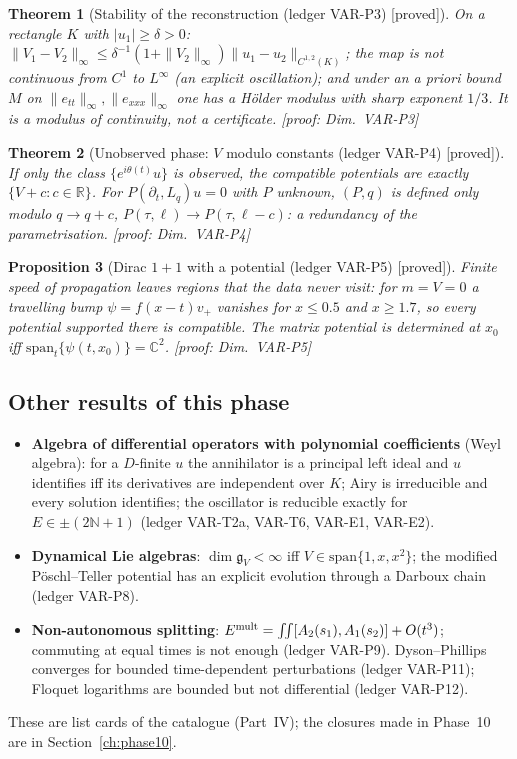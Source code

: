\documentclass[11pt]{article}
\theoremstyle{plain}
\newtheorem{theorem}{Theorem}[section]
\newtheorem{proposition}[theorem]{Proposition}
\theoremstyle{definition}
\theoremstyle{remark}
\newcommand{\R}{\mathbb{R}}
\newcommand{\C}{\mathbb{C}}
\newcommand{\N}{\mathbb{N}}
\newcommand{\badge}[2]{\textcolor{#1}{\textsf{\footnotesize[#2]}}}
\newcommand{\proved}[1][]{\badge{cC}{proved#1}}
\newcommand{\led}[1]{\textcolor{cG}{\textsf{\footnotesize(ledger #1)}}}
\newcommand{\dimref}[1]{\textsf{\footnotesize[proof: Dim.~#1]}}
\begin{document}
\begin{theorem}[{Stability of the reconstruction \led{VAR-P3} \proved}]\label{thm:varp3}
On a rectangle $K$ with $|u_1|\ge\delta>0$: $\|V_1-V_2\|_\infty\le\delta^{-1}(1+\|V_2\|_\infty)\|u_1-u_2\|_{C^{1,2}(K)}$; the map is not continuous from $C^1$ to $L^\infty$ (an explicit oscillation); and under an a priori bound $M$ on $\|e_{tt}\|_\infty,\|e_{xxx}\|_\infty$ one has a H\"older modulus with sharp exponent $1/3$. It is a modulus of continuity, not a certificate.
\dimref{VAR-P3}
\end{theorem}

\begin{theorem}[{Unobserved phase: $V$ modulo constants \led{VAR-P4} \proved}]\label{thm:varp4}
If only the class $\{e^{i\theta(t)}u\}$ is observed, the compatible potentials are exactly $\{V+c:c\in\R\}$. For $P(\partial_t,L_q)u=0$ with $P$ unknown, $(P,q)$ is defined only modulo $q\to q+c$, $P(\tau,\ell)\to P(\tau,\ell-c)$: a redundancy of the parametrisation.
\dimref{VAR-P4}
\end{theorem}

\begin{proposition}[{Dirac $1+1$ with a potential \led{VAR-P5} \proved}]\label{prop:varp5}
Finite speed of propagation leaves regions that the data never visit: for $m=V=0$ a travelling bump $\psi=f(x-t)v_+$ vanishes for $x\le0.5$ and $x\ge1.7$, so every potential supported there is compatible. The matrix potential is determined at $x_0$ iff $\mathrm{span}_t\{\psi(t,x_0)\}=\C^2$.
\dimref{VAR-P5}
\end{proposition}

\subsection{Other results of this phase}

\begin{itemize}
\item \textbf{Algebra of differential operators with polynomial coefficients} (Weyl algebra): for a $D$-finite $u$ the annihilator is a principal left ideal and $u$ identifies iff its derivatives are independent over $K$; Airy is irreducible and every solution identifies; the oscillator is reducible exactly for $E\in\pm(2\N+1)$ \led{VAR-T2a, VAR-T6, VAR-E1, VAR-E2}.
\item \textbf{Dynamical Lie algebras}: $\dim\mathfrak g_V<\infty$ iff $V\in\mathrm{span}\{1,x,x^2\}$; the modified P\"oschl--Teller potential has an explicit evolution through a Darboux chain \led{VAR-P8}.
\item \textbf{Non-autonomous splitting}: $E^{\rm mult}=\iint[A_2(s_1),A_1(s_2)]+O(t^3)$; commuting at equal times is not enough \led{VAR-P9}. Dyson--Phillips converges for bounded time-dependent perturbations \led{VAR-P11}; Floquet logarithms are bounded but not differential \led{VAR-P12}.
\end{itemize}
These are list cards of the catalogue (Part~IV); the closures made in Phase~10 are in Section~\ref{ch:phase10}.
\end{document}
